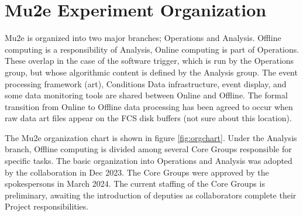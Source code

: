 \section{Mu2e Experiment Organization}
\label{sec:mu2eorg}
Mu2e is organized into two major branches; Operations and Analysis.  Offline computing is a responsibility of Analysis, Online computing is part of Operations.  These overlap in the case of the software trigger, which is run by the Operations group, but whose algorithmic content is defined by the Analysis group.  The event processing framework (art), Conditions Data infrastructure, event display, and some data monitoring tools are shared between Online and Offline.   The formal transition from Online to Offline data processing has been agreed to occur when raw data art files appear on the FCS disk buffers (not sure about this location).

The Mu2e organization chart is shown in figure \ref{fig:orgchart}.  Under the Analysis branch, Offline computing is divided among several Core Groups responsible for specific tasks.  The basic organization into Operations and Analysis was adopted by the collaboration in Dec 2023.  The Core Groups were approved by the spokespersons in March 2024.  The current staffing of the Core Groups is preliminary, awaiting the introduction of deputies as collaborators complete their Project responsibilities.



